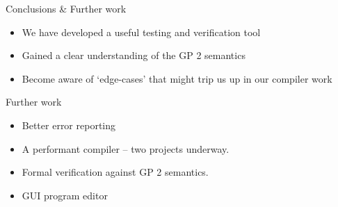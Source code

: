 \begin{frame}{Conclusions \& Further work}

\begin{itemize}
\itemsep1pt\parskip0pt
\item
  We have developed a useful testing and verification tool
\item
  Gained a clear understanding of the GP 2 semantics
\item
  Become aware of `edge-cases' that might trip us up in our compiler
  work
\end{itemize}

\begin{block}{Further work}

\begin{itemize}
\itemsep1pt\parskip0pt
\item
  Better error reporting
\item
  A performant compiler -- two projects underway.
\item
  Formal verification against GP 2 semantics.
\item
  GUI program editor
\end{itemize}

\end{block}

\end{frame}
